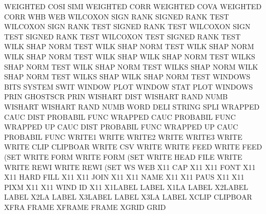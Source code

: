 WEIGHTED COSI SIMI                      WEIGHTED CORR
WEIGHTED COVA                           WEIGHTED CORR
WHB                                     WEB
WILCOXON SIGN RANK                      SIGNED   RANK TEST
WILCOXON SIGN RANK TEST                 SIGNED   RANK TEST
WILCOXON SIGN TEST                      SIGNED   RANK TEST
WILCOXON TEST                           SIGNED   RANK TEST
WILK     SHAP NORM TEST                 WILK     SHAP NORM TEST
WILK     SHAP NORM                      WILK     SHAP NORM TEST
WILK     SHAP                           WILK     SHAP NORM TEST
WILKS    SHAP NORM TEST                 WILK     SHAP NORM TEST
WILKS    SHAP NORM                      WILK     SHAP NORM TEST
WILKS    SHAP                           WILK     SHAP NORM TEST
WINDOWS  BITS                           SYSTEM   SWIT
WINDOW   PLOT                           WINDOW   STAT PLOT
WINDOWS  PRIN                           GHOSTSCR PRIN
WISHART  DIST                           WISHART  RAND NUMB
WISHART                                 WISHART  RAND NUMB
WORD     DELI                           STRING   SPLI
WRAPPED  CAUC DIST                      PROBABIL FUNC
WRAPPED  CAUC                           PROBABIL FUNC
WRAPPED  UP   CAUC DIST                 PROBABIL FUNC
WRAPPED  UP   CAUC                      PROBABIL FUNC
WRITE1                                  WRITE
WRITE2                                  WRITE
WRITE3                                  WRITE
WRITE    CLIP                           CLIPBOAR
WRITE    CSV                            WRITE
WRITE    FEED                           WRITE    FEED (SET
WRITE    FORM                           WRITE    FORM (SET
WRITE    HEAD FILE                      WRITE
WRITE    REWI                           WRITE    REWI (SET
WS                                      WEB
X11      CAP                            X11
X11      FONT                           X11
X11      HARD FILL                      X11
X11      JOIN                           X11
X11      NAME                           X11
X11      PAUS                           X11
X11      PIXM                           X11
X11      WIND ID                        X11
X1LABEL                                 LABEL
X1LA                                    LABEL
X2LABEL                                 LABEL
X2LA                                    LABEL
X3LABEL                                 LABEL
X3LA                                    LABEL
XCLIP                                   CLIPBOAR
XFRA                                    FRAME
XFRAME                                  FRAME
XGRID                                   GRID
